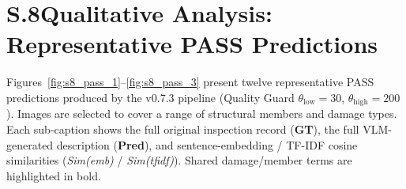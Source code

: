 \clearpage
\section*{S.8\quad Qualitative Analysis: Representative PASS Predictions}
\label{sec:s8}

Figures~\ref{fig:s8_pass_1}--\ref{fig:s8_pass_3} present twelve representative PASS predictions produced by the v0.7.3 pipeline (Quality Guard \(\theta_{\mathrm{low}}=30\), \(\theta_{\mathrm{high}}=200\)). Images are selected to cover a range of structural members and damage types. Each sub-caption shows the full original inspection record (\textbf{GT}), the full VLM-generated description (\textbf{Pred}), and sentence-embedding / TF-IDF cosine similarities (\textit{Sim(emb)} / \textit{Sim(tfidf)}). Shared damage/member terms are highlighted in bold.

